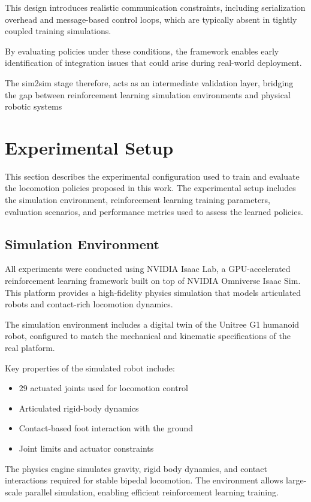 \documentclass[pdflatex,sn-mathphys-num]{sn-jnl}%
\theoremstyle{thmstyleone}%
\theoremstyle{thmstyletwo}%
\theoremstyle{thmstylethree}%
\begin{document}
This design introduces realistic communication constraints, including serialization overhead and message-based control loops, which are typically absent in tightly coupled training simulations.

By evaluating policies under these conditions, the framework enables early identification of integration issues that could arise during real-world deployment.

The sim2sim stage therefore, acts as an intermediate validation layer, bridging the gap between reinforcement learning simulation environments and physical robotic systems

\section{Experimental Setup}
\label{experimental}
This section describes the experimental configuration used to train and evaluate the locomotion policies proposed in this work. The experimental setup includes the simulation environment, reinforcement learning training parameters, evaluation scenarios, and performance metrics used to assess the learned policies.

\subsection{Simulation Environment}
All experiments were conducted using NVIDIA Isaac Lab, a GPU-accelerated reinforcement learning framework built on top of NVIDIA Omniverse Isaac Sim. This platform provides a high-fidelity physics simulation that models articulated robots and contact-rich locomotion dynamics.

The simulation environment includes a digital twin of the Unitree G1 humanoid robot, configured to match the mechanical and kinematic specifications of the real platform.

Key properties of the simulated robot include:
\begin{itemize}
    \item 29 actuated joints used for locomotion control
    \item Articulated rigid-body dynamics
    \item Contact-based foot interaction with the ground
    \item Joint limits and actuator constraints
\end{itemize}    

The physics engine simulates gravity, rigid body dynamics, and contact interactions required for stable bipedal locomotion. The environment allows large-scale parallel simulation, enabling efficient reinforcement learning training.
\end{document}
